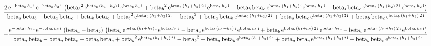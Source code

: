 \documentclass[9pt]{article}
\begin{document}
  \begin{equation}
    \centering
    \frac{2\, \mathrm{e}^{- \mathrm{beta}_{b}\, h_{1}\, \mathrm{i}}\, \mathrm{e}^{- \mathrm{beta}_{b}\, h_{2}\, \mathrm{i}}\, \left({\mathrm{beta}_{b}}^2\, \mathrm{e}^{\mathrm{beta}_{b}\, \left(h_{1} + h_{2}\right)\, \mathrm{i}}\, \mathrm{e}^{\mathrm{beta}_{b}\, h_{1}\, \mathrm{i}} + {\mathrm{beta}_{b}}^2\, \mathrm{e}^{\mathrm{beta}_{b}\, \left(h_{1} + h_{2}\right)\, 2\, \mathrm{i}}\, \mathrm{e}^{\mathrm{beta}_{b}\, h_{2}\, \mathrm{i}} - \mathrm{beta}_{b}\, \mathrm{beta}_{c}\, \mathrm{e}^{\mathrm{beta}_{b}\, \left(h_{1} + h_{2}\right)\, \mathrm{i}}\, \mathrm{e}^{\mathrm{beta}_{b}\, h_{1}\, \mathrm{i}} + \mathrm{beta}_{b}\, \mathrm{beta}_{c}\, \mathrm{e}^{\mathrm{beta}_{b}\, \left(h_{1} + h_{2}\right)\, 2\, \mathrm{i}}\, \mathrm{e}^{\mathrm{beta}_{b}\, h_{2}\, \mathrm{i}}\right)}{\mathrm{beta}_{a}\, \mathrm{beta}_{b} - \mathrm{beta}_{a}\, \mathrm{beta}_{c} + \mathrm{beta}_{b}\, \mathrm{beta}_{c} + {\mathrm{beta}_{b}}^2\, \mathrm{e}^{\mathrm{beta}_{b}\, \left(h_{1} + h_{2}\right)\, 2\, \mathrm{i}} - {\mathrm{beta}_{b}}^2 + \mathrm{beta}_{a}\, \mathrm{beta}_{b}\, \mathrm{e}^{\mathrm{beta}_{b}\, \left(h_{1} + h_{2}\right)\, 2\, \mathrm{i}} + \mathrm{beta}_{a}\, \mathrm{beta}_{c}\, \mathrm{e}^{\mathrm{beta}_{b}\, \left(h_{1} + h_{2}\right)\, 2\, \mathrm{i}} + \mathrm{beta}_{b}\, \mathrm{beta}_{c}\, \mathrm{e}^{\mathrm{beta}_{b}\, \left(h_{1} + h_{2}\right)\, 2\, \mathrm{i}}}
    \label{eq:X1}
  \end{equation}

  \begin{equation}
    \centering
    -\frac{\mathrm{e}^{- \mathrm{beta}_{b}\, h_{1}\, \mathrm{i}}\, \mathrm{e}^{- \mathrm{beta}_{b}\, h_{2}\, \mathrm{i}}\, \left(\mathrm{beta}_{a} - \mathrm{beta}_{b}\right)\, \left(\mathrm{beta}_{b}\, \mathrm{e}^{\mathrm{beta}_{b}\, \left(h_{1} + h_{2}\right)\, \mathrm{i}}\, \mathrm{e}^{\mathrm{beta}_{b}\, h_{1}\, \mathrm{i}} - \mathrm{beta}_{c}\, \mathrm{e}^{\mathrm{beta}_{b}\, \left(h_{1} + h_{2}\right)\, \mathrm{i}}\, \mathrm{e}^{\mathrm{beta}_{b}\, h_{1}\, \mathrm{i}} + \mathrm{beta}_{b}\, \mathrm{e}^{\mathrm{beta}_{b}\, \left(h_{1} + h_{2}\right)\, 2\, \mathrm{i}}\, \mathrm{e}^{\mathrm{beta}_{b}\, h_{2}\, \mathrm{i}} + \mathrm{beta}_{c}\, \mathrm{e}^{\mathrm{beta}_{b}\, \left(h_{1} + h_{2}\right)\, 2\, \mathrm{i}}\, \mathrm{e}^{\mathrm{beta}_{b}\, h_{2}\, \mathrm{i}}\right)}{\mathrm{beta}_{a}\, \mathrm{beta}_{b} - \mathrm{beta}_{a}\, \mathrm{beta}_{c} + \mathrm{beta}_{b}\, \mathrm{beta}_{c} + {\mathrm{beta}_{b}}^2\, \mathrm{e}^{\mathrm{beta}_{b}\, \left(h_{1} + h_{2}\right)\, 2\, \mathrm{i}} - {\mathrm{beta}_{b}}^2 + \mathrm{beta}_{a}\, \mathrm{beta}_{b}\, \mathrm{e}^{\mathrm{beta}_{b}\, \left(h_{1} + h_{2}\right)\, 2\, \mathrm{i}} + \mathrm{beta}_{a}\, \mathrm{beta}_{c}\, \mathrm{e}^{\mathrm{beta}_{b}\, \left(h_{1} + h_{2}\right)\, 2\, \mathrm{i}} + \mathrm{beta}_{b}\, \mathrm{beta}_{c}\, \mathrm{e}^{\mathrm{beta}_{b}\, \left(h_{1} + h_{2}\right)\, 2\, \mathrm{i}}}

    \label{eq:X2}
  \end{equation}
\end{document}
